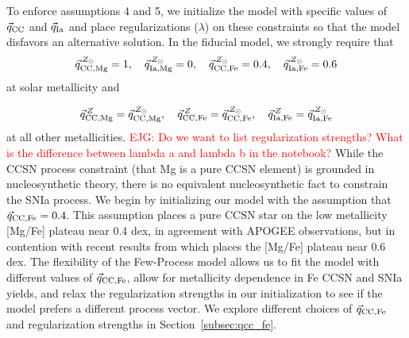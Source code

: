 \documentclass[modern]{aastex631}
\newcommand{\ejg}[1]{\textcolor{red}{EJG: #1}}
\begin{document}
To enforce assumptions 4 and 5, we initialize the model with specific values of $\vec{q}_{{\rm CC}}$ and $\vec{q}_{{\rm Ia}}$ and place regularizations ($\lambda$) on these constraints so that the model disfavors an alternative solution. In the fiducial model, we strongly require that
\begin{equation}\label{eq:qcc_solar}
    \vec{q}_{{\rm CC, Mg}}^{\,Z_{\odot}} = 1, \quad \vec{q}_{{\rm Ia, Mg}}^{\,Z_{\odot}} = 0, \quad 
    \vec{q}_{{\rm CC, Fe}}^{\,Z_{\odot}} = 0.4, \quad \vec{q}_{{\rm Ia, Fe}}^{\,Z_{\odot}} = 0.6
\end{equation}
at solar metallicity and 

\begin{equation}\label{eq:qcc_z}
    \vec{q}_{{\rm CC, Mg}}^{\,Z} = \vec{q}_{{\rm CC, Mg}}^{\,Z_{\odot}}, \quad 
    \vec{q}_{{\rm CC, Fe}}^{\,Z} = \vec{q}_{{\rm CC, Fe}}^{\,Z_{\odot}},  \quad 
    \vec{q}_{{\rm Ia, Fe}}^{\,Z} = \vec{q}_{{\rm Ia, Fe}}^{\,Z_{\odot}}
\end{equation}
at all other metallicities.
\ejg{Do we want to list regularization strengths? What is the difference between lambda a and lambda b in the notebook?} 
While the CCSN process constraint (that Mg is a pure CCSN element) is grounded in nucleosynthetic theory, there is no equivalent nucleosynthetic fact to constrain the SNIa process. We begin by initializing our model with the assumption that $\vec{q}_{{\rm CC, Fe}} = 0.4$. This assumption places a pure CCSN star on the low metallicity [Mg/Fe] plateau near 0.4 dex, in agreement with APOGEE observations, but in contention with recent results from \citet{conroy2022} which places the [Mg/Fe] plateau near 0.6 dex. The flexibility of the Few-Process model allows us to fit the model with different values of $\vec{q}_{{\rm CC, Fe}}$, allow for metallicity dependence in Fe CCSN and SNIa yields, and relax the regularization strengths in our initialization to see if the model prefers a different process vector. We explore different choices of $\vec{q}_{{\rm CC, Fe}}$ and regularization strengths in Section~\ref{subsec:qcc_fe}.
\end{document}
